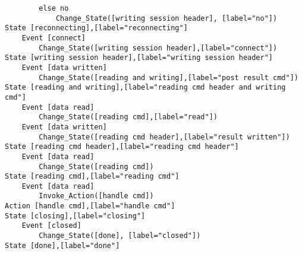 \begin{verbatim}
		else no
			Change_State([writing session header], [label="no"])
State [reconnecting],[label="reconnecting"]
	Event [connect]
		Change_State([writing session header],[label="connect"])
State [writing session header],[label="writing session header"]
	Event [data written]
		Change_State([reading and writing],[label="post result cmd"])
State [reading and writing],[label="reading cmd header and writing cmd"]
	Event [data read]
		Change_State([reading cmd],[label="read"])
	Event [data written]
		Change_State([reading cmd header],[label="result written"])
State [reading cmd header],[label="reading cmd header"]
	Event [data read]
		Change_State([reading cmd])
State [reading cmd],[label="reading cmd"]
	Event [data read]
		Invoke_Action([handle cmd])
Action [handle cmd],[label="handle cmd"]
State [closing],[label="closing"]
	Event [closed]
		Change_State([done], [label="closed"])
State [done],[label="done"]
\end{verbatim}
